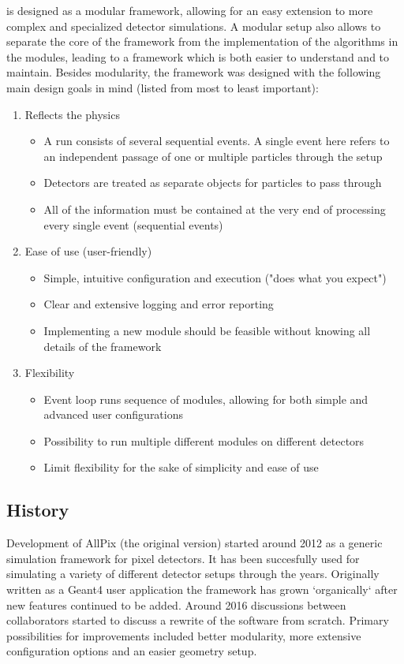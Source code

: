\apsq is designed as a modular framework, allowing for an easy extension to more complex and specialized detector simulations. A modular setup also allows to separate the core of the framework from the implementation of the algorithms in the modules, leading to a framework which is both easier to understand and to maintain. Besides modularity, the \apsq framework was designed with the following main design goals in mind (listed from most to least important):
\begin{enumerate}
    \item Reflects the physics
    \begin{itemize}
        \item A run consists of several sequential events. A single event here refers to an independent passage of one or multiple particles through the setup
        \item Detectors are treated as separate objects for particles to pass through
        \item All of the information must be contained at the very end of processing every single event (sequential events)
    \end{itemize}
    \item Ease of use (user-friendly)
    \begin{itemize}
        \item Simple, intuitive configuration and execution ("does what you expect")
        \item Clear and extensive logging and error reporting
        \item Implementing a new module should be feasible without knowing all details of the framework
    \end{itemize}
    \item Flexibility
    \begin{itemize}
        \item Event loop runs sequence of modules, allowing for both simple and advanced user configurations
        \item Possibility to run multiple different modules on different detectors
        \item Limit flexibility for the sake of simplicity and ease of use
    \end{itemize}
\end{enumerate}

\subsection{History}
Development of AllPix (the original version) started around 2012 as a generic simulation framework for pixel detectors. It has been succesfully used for simulating a variety of different detector setups through the years. Originally written as a Geant4 user application the framework has grown `organically` after new features continued to be added. Around 2016 discussions between collaborators started to discuss a rewrite of the software from scratch. Primary possibilities for improvements included better modularity, more extensive configuration options and an easier geometry setup.

